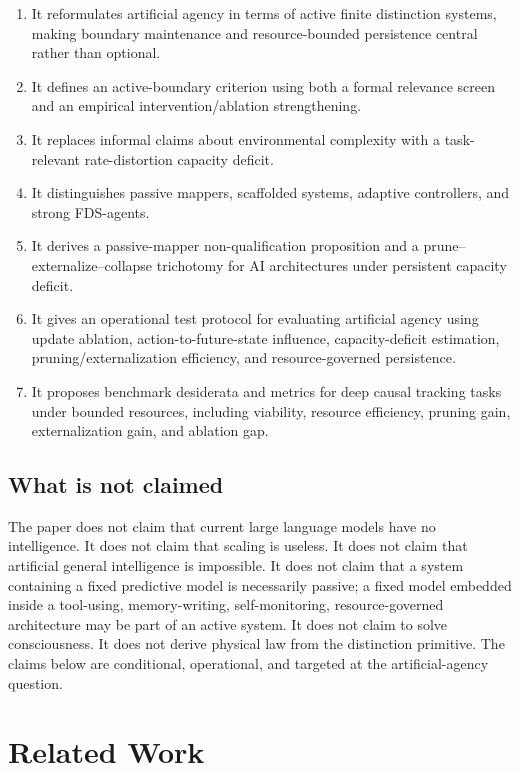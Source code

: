 \documentclass[10pt,a4paper,twocolumn,aps,prl]{revtex4-2}
\begin{document}
\begin{enumerate}[leftmargin=2em]
    \item It reformulates artificial agency in terms of active finite distinction systems, making boundary maintenance and resource-bounded persistence central rather than optional.
    \item It defines an active-boundary criterion using both a formal relevance screen and an empirical intervention/ablation strengthening.
    \item It replaces informal claims about environmental complexity with a task-relevant rate-distortion capacity deficit.
    \item It distinguishes passive mappers, scaffolded systems, adaptive controllers, and strong FDS-agents.
    \item It derives a passive-mapper non-qualification proposition and a prune--externalize--collapse trichotomy for AI architectures under persistent capacity deficit.
    \item It gives an operational test protocol for evaluating artificial agency using update ablation, action-to-future-state influence, capacity-deficit estimation, pruning/externalization efficiency, and resource-governed persistence.
    \item It proposes benchmark desiderata and metrics for deep causal tracking tasks under bounded resources, including viability, resource efficiency, pruning gain, externalization gain, and ablation gap.
\end{enumerate}

\subsection{What is not claimed}

The paper does not claim that current large language models have no intelligence. It does not claim that scaling is useless. It does not claim that artificial general intelligence is impossible. It does not claim that a system containing a fixed predictive model is necessarily passive; a fixed model embedded inside a tool-using, memory-writing, self-monitoring, resource-governed architecture may be part of an active system. It does not claim to solve consciousness. It does not derive physical law from the distinction primitive. The claims below are conditional, operational, and targeted at the artificial-agency question.

\section{Related Work}
\end{document}
